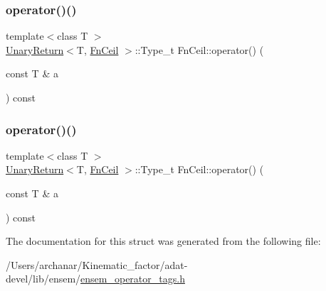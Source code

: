 \mbox{\label{structFnCeil_a9588c4122c2bacfe31df3cf25cb9d172}} 
\subsubsection{\texorpdfstring{operator()()}{operator()()}\hspace{0.1cm}{\footnotesize\ttfamily [2/3]}}
{\footnotesize\ttfamily template$<$class T $>$ \\
\mbox{\hyperlink{structUnaryReturn}{Unary\+Return}}$<$T, \mbox{\hyperlink{structFnCeil}{Fn\+Ceil}} $>$\+::Type\+\_\+t Fn\+Ceil\+::operator() (\begin{DoxyParamCaption}\item[{const T \&}]{a }\end{DoxyParamCaption}) const\hspace{0.3cm}{\ttfamily [inline]}}

\mbox{\label{structFnCeil_a9588c4122c2bacfe31df3cf25cb9d172}} 
\subsubsection{\texorpdfstring{operator()()}{operator()()}\hspace{0.1cm}{\footnotesize\ttfamily [3/3]}}
{\footnotesize\ttfamily template$<$class T $>$ \\
\mbox{\hyperlink{structUnaryReturn}{Unary\+Return}}$<$T, \mbox{\hyperlink{structFnCeil}{Fn\+Ceil}} $>$\+::Type\+\_\+t Fn\+Ceil\+::operator() (\begin{DoxyParamCaption}\item[{const T \&}]{a }\end{DoxyParamCaption}) const\hspace{0.3cm}{\ttfamily [inline]}}



The documentation for this struct was generated from the following file\+:\begin{DoxyCompactItemize}
\item 
/\+Users/archanar/\+Kinematic\+\_\+factor/adat-\/devel/lib/ensem/\mbox{\hyperlink{adat-devel_2lib_2ensem_2ensem__operator__tags_8h}{ensem\+\_\+operator\+\_\+tags.\+h}}\end{DoxyCompactItemize}
